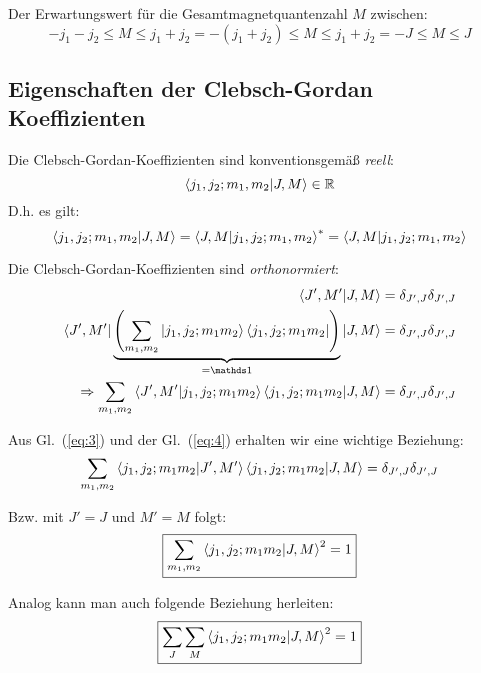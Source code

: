 Der Erwartungswert für die Gesamtmagnetquantenzahl \(M\) zwischen:
\begin{equation}
  \label{eq:11}
  -j_1-j_2\leq M \leq j_1+j_2=-(j_1+j_2)\leq M \leq j_1+j_2
  =-J\leq M \leq J
\end{equation}




\subsection*{Eigenschaften der Clebsch-Gordan Koeffizienten}
\label{sec:eigensch-der-clebsch}

Die Clebsch-Gordan-Koeffizienten sind konventionsgemäß \emph{reell}:
\begin{equation}
  \label{eq:2}
  \braket{j_1,j_2;m_1,m_2}{J,M} \in \mathbb R
\end{equation}
D.h. es gilt:
\begin{equation}
  \label{eq:3}
  \braket{j_1,j_2;m_1,m_2}{J,M} = \braket{J,M}{j_1,j_2;m_1,m_2}^*=
  \braket{J,M}{j_1,j_2;m_1,m_2}
\end{equation}

Die Clebsch-Gordan-Koeffizienten sind \emph{orthonormiert}:
\begin{align}
  \label{eq:4}
  \braket{J',M'}{J,M}&=\delta_{J',J}\delta_{J',J}\notag\\
  \bra{J',M'}\underbrace{\left(
      \sum_{m_1,m_2}\ket{j_1,j_2;m_1m_2}\bra{j_1,j_2;m_1m_2}\right)
  }_{=\mathds 1}
  \ket{J,M}&=\delta_{J',J}\delta_{J',J}\notag\\
  \Rightarrow\sum_{m_1,m_2}\braket{J',M'}{j_1,j_2;m_1m_2}
  \braket{j_1,j_2;m_1m_2}{J,M}&=\delta_{J',J}\delta_{J',J}
\end{align}

Aus Gl.~(\ref{eq:3}) und der Gl.~(\ref{eq:4}) erhalten wir eine wichtige Beziehung:
\begin{equation}
  \label{eq:5}
  \sum_{m_1,m_2}\braket{j_1,j_2;m_1m_2}{J',M'}
  \braket{j_1,j_2;m_1m_2}{J,M}=\delta_{J',J}\delta_{J',J}
\end{equation}

Bzw. mit \(J'=J\) und \(M'=M\) folgt:
\begin{equation}
  \label{eq:6}
  \boxed{\sum_{m_1,m_2}\braket{j_1,j_2;m_1m_2}{J,M}^2=1}
\end{equation}

Analog kann man auch folgende Beziehung herleiten:
\begin{equation}
  \label{eq:7}
  \boxed{\sum_{J}\sum_{M}\braket{j_1,j_2;m_1m_2}{J,M}^2=1}
\end{equation}


